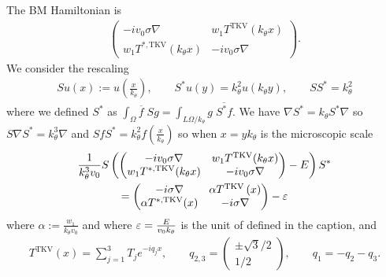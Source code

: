 \documentclass[11pt,a4paper,reqno,french,tikz]{amsart}
\newcommand{\pa}[1]{\left( #1 \right)} %
\newcommand{\na}{\nabla} %
\newcommand{\f}[2]{\frac{#1}{#2}} %
\newcommand{\mat}[1]{\begin{pmatrix} #1 \end{pmatrix}} %
\begin{document}
The BM Hamiltonian is
\begin{align*}
\mat{-i v_0 \sigma \na & w_1 T^{\text{TKV}}(k_\theta x) \\ w_1 T^{*,\text{TKV}}(k_\theta x) & -iv_0 \sigma \na}.
\end{align*}
We consider the rescaling
\begin{align*}
Su(x) := u\pa{\f{x}{k_\theta}}, \qquad S^*u(y) = k_\theta^2 u\pa{k_\theta y}, \qquad S S^* = k_\theta^2
\end{align*}
where we defined $S^*$ as $\int_\Omega \overline{f} \; Sg = \int_{L\Omega/k_\theta} g \; \overline{S^*f}$.
We have $\na S^* = k_\theta S^* \na$ so $S \na S^* = k_\theta^3 \na$ and $SfS^* = k_\theta^2 f\pa{\f{x}{k_\theta}}$ so when $x = y k_\theta$ is the microscopic scale
\begin{multline*}
	\f{1}{k_\theta^3 v_0} S \pa{\mat{-i v_0 \sigma \na & w_1 T^{\text{TKV}}(k_\theta x) \\ w_1 T^{*,\text{TKV}}(k_\theta x) & -iv_0 \sigma \na} -E} S^* \\
	= \mat{-i\sigma \na & \alpha T^{\text{TKV}}\pa{x} \\ \alpha T^{*,\text{TKV}}(x) & -i\sigma \na} - \ep
\end{multline*}
where $\alpha := \f{w_1}{k_\theta v_0}$ and where $\ep = \f{E}{v_0 k_\theta}$ is the unit of \cite[Fig 1]{TarKruVis19} defined in the caption, and
\begin{align*}
T^{\text{TKV}}(x) = \sum_{j=1}^3 T_j e^{-i q_j x}, \qquad q_{2,3} = \mat{\pm \sqrt{3}/2 \\ 1/2}, \qquad q_1 = - q_2 - q_3.
\end{align*}%
\end{document}
